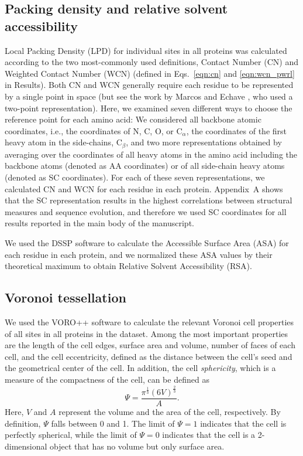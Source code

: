 \documentclass[12pt]{article}
\begin{document}
\subsection*{Packing density and relative solvent accessibility}

Local Packing Density (LPD) for individual sites in all proteins was calculated according to the two most-commonly used definitions, Contact Number (CN) and Weighted Contact Number (WCN) (defined in Eqs.~\ref{eqn:cn} and \ref{eqn:wcn_pwrl} in Results). Both CN and WCN generally require each residue to be represented by a single point in space 
(but see the work by Marcos and Echave \cite{marcos_too_2015}, who used a two-point representation). Here, we examined seven different ways to choose the reference point for each amino acid: We considered all backbone atomic coordinates, i.e., the coordinates of N, C, O, or C{$_\alpha$}, the coordinates of the first heavy atom in the side-chains, C{$_\beta$}, and two more representations obtained by averaging over the coordinates of all heavy atoms in the amino acid including the backbone atoms (denoted as AA coordinates) or of all side-chain heavy atoms (denoted as SC coordinates). For each of these seven representations, we calculated CN and WCN for each residue in each protein. Appendix~A shows that the SC representation results in the highest correlations between structural measures and sequence evolution, and therefore we used SC coordinates for all results reported in the main body of the manuscript.

We used the DSSP software \cite{kabsch_dictionary_1983} to calculate  the Accessible Surface Area (ASA) for each residue in each protein, and we normalized these ASA values by their theoretical maximum \cite{tien_maximum_2013} to obtain Relative Solvent Accessibility (RSA). 

\subsection*{Voronoi tessellation}

We used the VORO++ software \cite{rycroft_voro++:_2009} to calculate the relevant Voronoi cell properties of all sites in all proteins in the dataset. Among the most important properties are the length of the cell edges, surface area and volume, number of faces of each cell, and the cell eccentricity, defined as the distance between the cell's seed and the geometrical center of the cell. In addition, the cell {\it sphericity}, which is a measure of the compactness of the cell, can be defined as
    \begin{equation}
        \label{eqn:sphericity}
        \Psi = \frac{\pi^{\frac{1}{3}}(6V)^{\frac{2}{3}}}{A}.
    \end{equation}
Here, $V$ and $A$ represent the volume and the area of the cell, respectively.  By definition, $\Psi$ falls between 0 and 1. The limit of $\Psi=1$ indicates that the cell is perfectly spherical, while the limit of $\Psi=0$ indicates that the cell is a 2-dimensional object that has no volume but only surface area.
\end{document}
